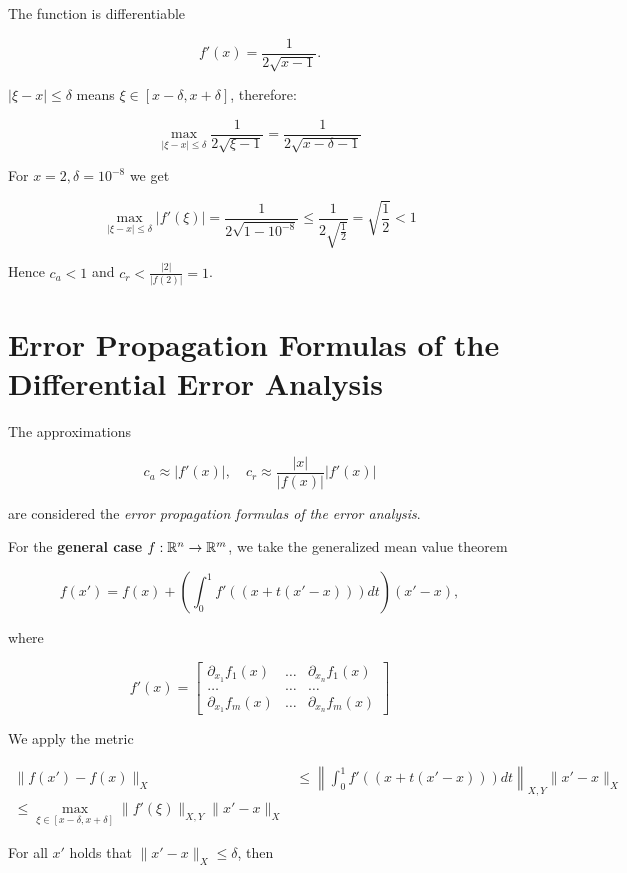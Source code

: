 The function is differentiable 

\[
    f'(x) = \frac{1}{2\sqrt{x - 1}}.
\]

\(|\xi - x| \le \delta\) means \(\xi \in [x - \delta, x + \delta]\), therefore: 

\[
    \max_{|\xi - x| \le \delta} \frac{1}{2\sqrt{\xi - 1}} = \frac{1}{2\sqrt{x - \delta - 1}}
\]

For \(x = 2, \delta = 10^{-8}\) we get 

\[
    \max_{|\xi - x| \le \delta} |f'(\xi)| = \frac{1}{2\sqrt{1 - 10^{-8}}} \le \frac{1}{2 \sqrt{\frac{1}{2}}} = \sqrt{\frac{1}{2}} < 1
\]

Hence \(c_a < 1\) and \(c_r < \frac{|2|}{|f(2)|} = 1\).


\section{Error Propagation Formulas of the Differential Error Analysis}

The approximations

\[
    c_a \approx |f'(x)|, \quad c_r \approx \frac{|x|}{|f(x)|}|f'(x)|
\]

are considered the \emph{error propagation formulas of the error analysis}.

For the \textbf{general case} \(f: \mathbb{R}^n \to \mathbb{R}^m\), we take the generalized mean value theorem 

\[
    f(x') = f(x) + \left(\int_{0}^{1} f'((x + t(x' - x)))dt\right)(x' - x),
\]

where 

\[
    f'(x) = 
    \begin{bmatrix}
        \partial_{x_1} f_1 (x) & \dots & \partial_{x_n} f_1 (x) \\ 
        \dots & \dots & \dots \\ 
        \partial_{x_1} f_m (x) & \dots & \partial_{x_n} f_m (x)
    \end{bmatrix}
\]

We apply the metric 

\begin{align*}
    \|f(x') - f(x)\|_X &\le \left\|\int_{0}^{1} f'((x + t(x' - x)))dt \right\|_{X,Y} \|x' - x\|_X \\ 
    \le \max_{\xi \in [x - \delta, x + \delta]} \|f'(\xi)\|_{X,Y} \|x' - x\|_X
\end{align*}

For all \(x'\) holds that \(\|x' - x\|_X \le \delta\), then 

